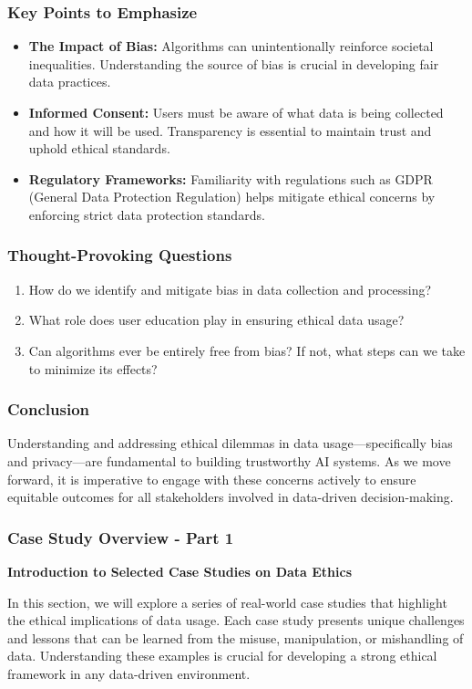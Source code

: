 \documentclass[aspectratio=169]{beamer}
\begin{document}
\begin{frame}[fragile]
    \frametitle{Key Points to Emphasize}
    \begin{itemize}
        \item \textbf{The Impact of Bias:} Algorithms can unintentionally reinforce societal inequalities. Understanding the source of bias is crucial in developing fair data practices.
        \item \textbf{Informed Consent:} Users must be aware of what data is being collected and how it will be used. Transparency is essential to maintain trust and uphold ethical standards.
        \item \textbf{Regulatory Frameworks:} Familiarity with regulations such as GDPR (General Data Protection Regulation) helps mitigate ethical concerns by enforcing strict data protection standards.
    \end{itemize}
\end{frame}

\begin{frame}[fragile]
    \frametitle{Thought-Provoking Questions}
    \begin{enumerate}
        \item How do we identify and mitigate bias in data collection and processing?
        \item What role does user education play in ensuring ethical data usage?
        \item Can algorithms ever be entirely free from bias? If not, what steps can we take to minimize its effects?
    \end{enumerate}
\end{frame}

\begin{frame}[fragile]
    \frametitle{Conclusion}
    Understanding and addressing ethical dilemmas in data usage—specifically bias and privacy—are fundamental to building trustworthy AI systems. As we move forward, it is imperative to engage with these concerns actively to ensure equitable outcomes for all stakeholders involved in data-driven decision-making.
\end{frame}

\begin{frame}[fragile]
    \frametitle{Case Study Overview - Part 1}
    \textbf{Introduction to Selected Case Studies on Data Ethics}
    
    In this section, we will explore a series of real-world case studies that highlight the ethical implications of data usage. Each case study presents unique challenges and lessons that can be learned from the misuse, manipulation, or mishandling of data. Understanding these examples is crucial for developing a strong ethical framework in any data-driven environment.
\end{frame}
\end{document}
